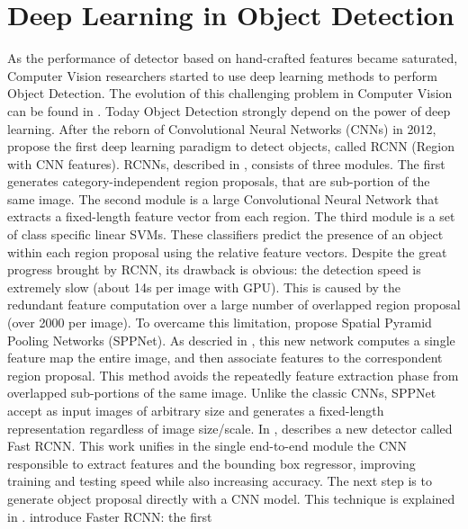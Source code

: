  \section{Deep Learning in Object Detection}
 As the performance of detector based on hand-crafted features became saturated, Computer Vision researchers started to use deep learning methods to perform Object Detection. The evolution of this challenging problem in Computer Vision can be found in \cite{computervisionsurvey}. Today Object Detection strongly depend on the power of deep learning. 
 After the reborn of Convolutional Neural Networks (CNNs) in 2012, \citeauthor{rcnn} propose the first deep learning paradigm to detect objects, called RCNN (Region with CNN features). RCNNs, described in \cite{rcnn}, consists of three modules. The first generates category-independent region proposals, that are sub-portion of the same image. The second module is a large Convolutional Neural Network that extracts a fixed-length feature
 vector from each region. The third module is a set of class specific linear SVMs. These classifiers predict the presence of an object within each region proposal using the relative feature vectors. Despite the great progress brought by RCNN, its drawback is obvious: the detection speed is extremely slow (about 14s per
 image with GPU). This is caused by the redundant feature computation over a large number of overlapped region proposal (over 2000 per image). To overcame this limitation, \citeauthor{sppnet} propose Spatial Pyramid Pooling Networks (SPPNet). As descried in \cite{sppnet}, this new network computes a single feature map the entire image, and then associate features to the correspondent region proposal. This method avoids the repeatedly feature extraction phase from overlapped sub-portions of the same image.  Unlike the classic CNNs, SPPNet accept as input images  of arbitrary size and generates a fixed-length representation regardless of image size/scale. In \cite{fastrcnn}, \citeauthor{fastrcnn} describes a new detector called Fast RCNN. This work unifies in the single end-to-end module the CNN responsible to extract features and the bounding box regressor, improving training and testing speed while also increasing accuracy. The next step is to generate object proposal directly with a CNN model. This technique is explained in \cite{fasterrcnn}. \citeauthor{fasterrcnn} introduce Faster RCNN: the first
